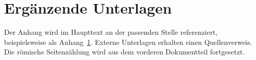 \chapter{Ergänzende Unterlagen}
\label{app:records}

Der Anhang wird im Haupttext an der passenden Stelle referenziert,
beispielsweise als Anhang~\ref{app:records}. Externe Unterlagen erhalten
einen Quellenverweis. Die römische Seitenzählung wird aus dem vorderen
Dokumentteil fortgesetzt.
